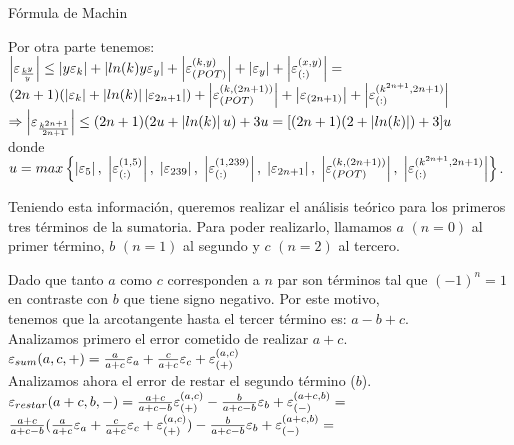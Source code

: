 \begin{subsection}{Fórmula de Machin}
	\pa
	
	Por otra parte tenemos:\\
	
	$\left|\varepsilon _{\frac{k^y}{y}}\right| \leq \left|y\varepsilon _{k}\right| + \left|ln(k)y\varepsilon _{y}\right| + \left|\varepsilon _{({POT})}^{({k,y})}\right| + \left|\varepsilon _{y}\right| + \left|\varepsilon _{({:})}^{({x,y})}\right| =$\\
	
	$(2n+1)(\left|\varepsilon _{k}\right| + \left|ln(k)\right|\left|\varepsilon _{2n+1}\right|) + \left|\varepsilon _{({POT})}^{({k,(2n+1)})}\right| + \left|\varepsilon _{(2n+1)}\right| + \left|\varepsilon _{({:})}^{({k^{2n+1},2n+1})}\right|$\\
	
	$\Rightarrow \left|\varepsilon _{\frac{k^{2n+1}}{2n+1}}\right| \leq (2n+1)(2u + \left|ln(k)\right|u) + 3u = [(2n+1)(2 + \left|ln(k)\right|) + 3]u$\\
	
	donde $u = max\left\{\left|\varepsilon _{5}\right|,\;\left|\varepsilon _{({:})}^{({1,5})}\right|,\;\left|\varepsilon _{239}\right|,\;\left|\varepsilon _{({:})}^{({1,239})}\right|,\;\left|\varepsilon _{2n+1}\right|,\;\left|\varepsilon _{({POT})}^{({k,(2n+1)})}\right|,\;\left|\varepsilon _{({:})}^{({k^{2n+1},2n+1})}\right|\right\}$.\\
	
	\pa
	
	Teniendo esta información, queremos realizar el análisis teórico para los primeros tres términos de la sumatoria. Para poder realizarlo, llamamos $a$ $(n=0)$ al primer término,
	$b$ $(n=1)$ al segundo y $c$ $(n=2)$ al tercero.
	
	Dado que tanto $a$ como $c$ corresponden a $n$ par son términos tal que $(-1)^n = 1$ en contraste con $b$ que tiene signo negativo. Por este motivo,\\
	tenemos que la arcotangente hasta el tercer término es: $a - b + c$.\\
	
	Analizamos primero el error cometido de realizar $a+c$.\\
	
	$\varepsilon _{sum}({a,c,+}) = \frac{a}{a+c}\varepsilon _{a} + \frac{c}{a+c}\varepsilon _{c} + \varepsilon _{({+})}^{({a,c})}$\\
	
	Analizamos ahora el error de restar el segundo término ($b$).\\
		
	$\varepsilon _{restar}({a+c,b,-}) = \frac{a+c}{a+c-b}\varepsilon _{({+})}^{({a,c})} - \frac{b}{a+c-b}\varepsilon _{b} + \varepsilon _{({-})}^{({a+c,b})} =$\\
	
	$\frac{a+c}{a+c-b}(\frac{a}{a+c}\varepsilon _{a} + \frac{c}{a+c}\varepsilon _{c} + \varepsilon _{({+})}^{({a,c})}) - \frac{b}{a+c-b}\varepsilon _{b} + \varepsilon _{({-})}^{({a+c,b})} =$\\
	

\end{subsection}
